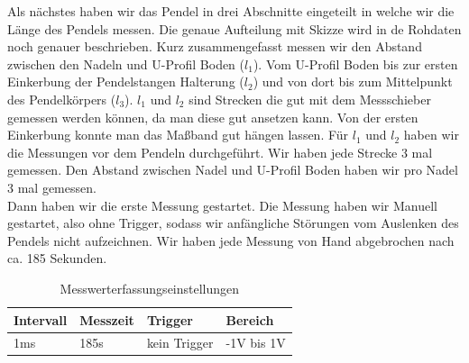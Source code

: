 \documentclass[twoside]{protokoll}
\begin{document}
 Als nächstes haben wir das Pendel in drei Abschnitte eingeteilt in welche wir die Länge des Pendels messen. 
 Die genaue Aufteilung mit Skizze wird in de Rohdaten noch genauer beschrieben. Kurz zusammengefasst messen wir den Abstand zwischen den Nadeln und U-Profil Boden ($l_1$).
Vom U-Profil Boden bis zur ersten Einkerbung der Pendelstangen Halterung ($l_2$) und von dort bis zum Mittelpunkt des Pendelkörpers ($l_3$).
$l_1$ und $l_2$ sind Strecken die gut mit dem Messschieber gemessen werden können, da man diese gut ansetzen kann. 
Von der ersten Einkerbung konnte man das Maßband gut hängen lassen.
Für $l_1$ und $l_2$ haben wir die Messungen vor dem Pendeln durchgeführt. 
Wir haben jede Strecke 3 mal gemessen. Den Abstand zwischen Nadel und U-Profil Boden haben wir pro Nadel 3 mal gemessen.\\

Dann haben wir die erste Messung gestartet. 
Die Messung haben wir Manuell gestartet, also ohne Trigger, sodass wir anfängliche Störungen vom Auslenken des Pendels nicht aufzeichnen. 
Wir haben jede Messung von Hand abgebrochen nach ca. 185 Sekunden. 

\begin{table}[H]
        \centering
        \begin{tabularx}{1.0\textwidth}{X X X X} %
            \toprule
            \textbf{Intervall} & \textbf{Messzeit} & \textbf{Trigger} & \textbf{Bereich} \\
            \midrule
            1ms & 185s & kein Trigger & -1V bis 1V \\
            \bottomrule
        \end{tabularx}
        \caption{Messwerterfassungseinstellungen}
        \label{tab:mytable}
    \end{table}
\end{document}
